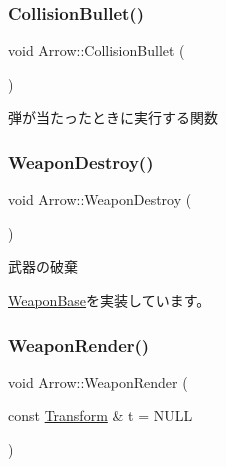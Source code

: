 \mbox{\label{class_arrow_afe567fd69597c0a5c44edd99c06d6f71}} 
\subsubsection{\texorpdfstring{Collision\+Bullet()}{CollisionBullet()}}
{\footnotesize\ttfamily void Arrow\+::\+Collision\+Bullet (\begin{DoxyParamCaption}{ }\end{DoxyParamCaption})}



弾が当たったときに実行する関数 

\mbox{\label{class_arrow_a6b9bfb7bf580c147e61d111b3cb2b293}} 
\subsubsection{\texorpdfstring{Weapon\+Destroy()}{WeaponDestroy()}}
{\footnotesize\ttfamily void Arrow\+::\+Weapon\+Destroy (\begin{DoxyParamCaption}{ }\end{DoxyParamCaption})\hspace{0.3cm}{\ttfamily [virtual]}}



武器の破棄 



\mbox{\hyperlink{class_weapon_base_a417784a8c8bf73cd398a77b922fc110c}{Weapon\+Base}}を実装しています。

\mbox{\label{class_arrow_a30553702b80c0559705a17d92389a1fc}} 
\subsubsection{\texorpdfstring{Weapon\+Render()}{WeaponRender()}}
{\footnotesize\ttfamily void Arrow\+::\+Weapon\+Render (\begin{DoxyParamCaption}\item[{const \mbox{\hyperlink{class_transform}{Transform}} \&}]{t = {\ttfamily NULL} }\end{DoxyParamCaption})\hspace{0.3cm}{\ttfamily [virtual]}}



